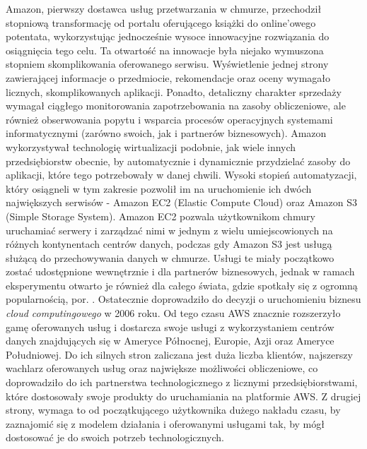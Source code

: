 \documentclass[12pt,a4paper,twoside]{article}
\begin{document}
Amazon, pierwszy dostawca usług przetwarzania w chmurze, przechodził stopniową transformację od portalu oferującego książki do online'owego potentata, wykorzystując jednocześnie wysoce innowacyjne rozwiązania do osiągnięcia tego celu. Ta otwartość na innowacje była niejako wymuszona stopniem skomplikowania oferowanego serwisu. Wyświetlenie jednej strony zawierającej informacje o przedmiocie, rekomendacje oraz oceny wymagało licznych, skomplikowanych aplikacji. Ponadto, detaliczny charakter sprzedaży wymagał ciągłego monitorowania zapotrzebowania na zasoby obliczeniowe, ale również obserwowania popytu i wsparcia  procesów operacyjnych systemami informatycznymi (zarówno swoich, jak i partnerów biznesowych). Amazon wykorzystywał technologię wirtualizacji podobnie, jak wiele innych przedsiębiorstw obecnie, by automatycznie i dynamicznie przydzielać zasoby do aplikacji, które tego potrzebowały w danej chwili. Wysoki stopień automatyzacji, który osiągneli w tym zakresie pozwolił im na uruchomienie ich dwóch największych serwisów -  Amazon EC2 (Elastic Compute Cloud) oraz Amazon S3 (Simple Storage System). Amazon EC2 pozwala użytkownikom chmury uruchamiać serwery i zarządzać nimi w jednym z wielu umiejscowionych na różnych kontynentach centrów danych, podczas gdy Amazon S3 jest usługą służącą do przechowywania danych w chmurze. Usługi te miały początkowo zostać udostępnione wewnętrznie i dla partnerów biznesowych, jednak w ramach eksperymentu otwarto je również dla całego świata, gdzie spotkały się z ogromną popularnością, por. \citet{shroff2010}. Ostatecznie doprowadziło do decyzji o uruchomieniu biznesu \textit{cloud computingowego} w 2006 roku. Od tego czasu AWS znacznie rozszerzyło gamę oferowanych usług i dostarcza swoje usługi z wykorzystaniem centrów danych znajdujących się w Ameryce Północnej, Europie, Azji oraz Ameryce Południowej. Do ich silnych stron zaliczana jest duża liczba klientów, najszerszy wachlarz oferowanych usług oraz największe możliwości obliczeniowe, co doprowadziło do ich partnerstwa technologicznego z licznymi przedsiębiorstwami, które dostosowały swoje produkty do uruchamiania na platformie AWS. Z drugiej strony, wymaga to od początkującego użytkownika dużego nakładu czasu, by zaznajomić się z modelem działania i oferowanymi usługami tak, by mógł dostosować je do swoich potrzeb technologicznych.
\end{document}
